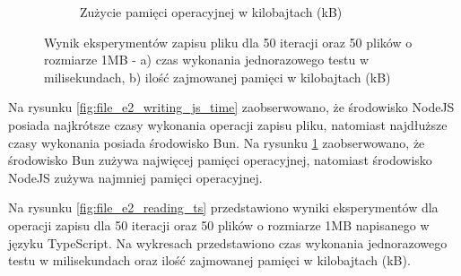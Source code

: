 \begin{figure}[H]
\begin{subfigure}[b]{0.44\textwidth}
    \caption{Zużycie pamięci operacyjnej w kilobajtach (kB)}
    \label{fig:file_e2_writing_js_memory}
  \end{subfigure}
  \hfill
  \caption{Wynik eksperymentów zapisu pliku dla 50 iteracji oraz 50 plików o rozmiarze 1MB - a) czas wykonania jednorazowego testu w milisekundach, b) ilość zajmowanej pamięci w kilobajtach (kB)}
  \label{fig:file_e2_writing_js}
\end{figure}

Na rysunku \ref{fig:file_e2_writing_js_time} zaobserwowano, że środowisko NodeJS posiada najkrótsze czasy wykonania operacji zapisu pliku, natomiast najdłuższe czasy wykonania posiada środowisko Bun. Na rysunku \ref{fig:file_e2_writing_js_memory} zaobserwowano, że środowisko Bun zużywa najwięcej pamięci operacyjnej, natomiast środowisko NodeJS zużywa najmniej pamięci operacyjnej.

Na rysunku \ref{fig:file_e2_reading_ts} przedstawiono wyniki eksperymentów dla operacji zapisu dla 50 iteracji oraz 50 plików o rozmiarze 1MB napisanego w języku TypeScript. Na wykresach przedstawiono czas wykonania jednorazowego testu w milisekundach oraz ilość zajmowanej pamięci w kilobajtach (kB).

